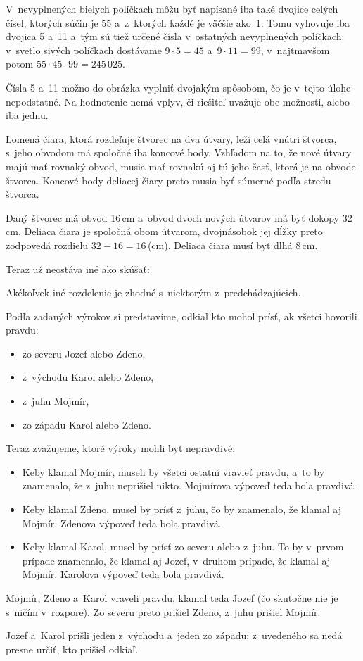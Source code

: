 {%
V~nevyplnených bielych políčkach môžu byť napísané iba také dvojice celých čísel, ktorých súčin je 55 a~z~ktorých každé je väčšie ako~1.
Tomu vyhovuje iba dvojica 5 a~11 a~tým sú tiež určené čísla v~ostatných nevyplnených políčkach:
v~svetlo sivých políčkach dostávame $9\cdot5=45$ a~$9\cdot11=99$,
v~najtmavšom potom $55\cdot45\cdot99=245\,025$.
%


\poznamka
Čísla 5 a~11 možno do obrázka vyplniť dvojakým spôsobom, čo je
v~tejto úlohe nepodstatné.
Na hodnotenie nemá vplyv, či riešiteľ uvažuje obe možnosti, alebo iba jednu.
}

{%
Lomená čiara, ktorá rozdeľuje štvorec na dva útvary, leží celá vnútri štvorca, s~jeho obvodom má spoločné iba koncové body.
Vzhľadom na to, že nové útvary majú mať rovnaký obvod, musia mať rovnakú aj tú jeho časť, ktorá je na obvode štvorca.
Koncové body deliacej čiary preto musia byť súmerné podľa stredu štvorca.

Daný štvorec má obvod 16\,cm a~obvod dvoch nových útvarov má byť dokopy 32\,cm.
Deliaca čiara je spoločná obom útvarom, dvojnásobok jej dĺžky preto zodpovedá rozdielu $32-16=16$\,(cm).
Deliaca čiara musí byť dlhá 8\,cm.

Teraz už neostáva iné ako skúšať:
%


\poznamka
Akékoľvek iné rozdelenie je zhodné s~niektorým z~predchádzajúcich.
}

{%
Podľa zadaných výrokov si predstavíme, odkiaľ kto mohol prísť, ak všetci hovorili pravdu:
\begin{itemize}
\item zo severu Jozef alebo Zdeno,
\item z~východu Karol alebo Zdeno,
\item z~juhu Mojmír,
\item zo západu Karol alebo Zdeno.
\end{itemize}
\noindent
Teraz zvažujeme, ktoré výroky mohli byť nepravdivé:
\begin{itemize}
\item Keby klamal Mojmír, museli by všetci ostatní vravieť pravdu, a~to by znamenalo, že z~juhu neprišiel nikto.
Mojmírova výpoveď teda bola pravdivá.
\item Keby klamal Zdeno, musel by prísť z~juhu, čo by znamenalo, že klamal aj Mojmír.
Zdenova výpoveď teda bola pravdivá.
\item Keby klamal Karol, musel by prísť zo severu alebo z~juhu. To by v~prvom prípade znamenalo, že klamal aj Jozef, v~druhom prípade, že klamal aj Mojmír.
Karolova výpoveď teda bola pravdivá.
\end{itemize}
Mojmír, Zdeno a~Karol vraveli pravdu, klamal teda Jozef (čo skutočne nie je s~ničím v~rozpore).
Zo severu preto prišiel Zdeno, z~juhu prišiel Mojmír.

\poznamka
Jozef a~Karol prišli jeden z~východu a~jeden zo západu; z~uvedeného sa nedá presne určiť, kto prišiel odkiaľ.
}

